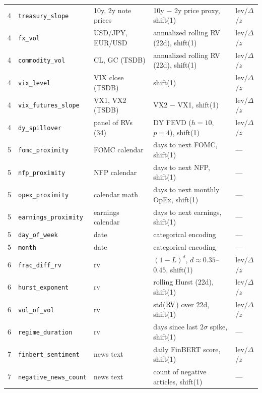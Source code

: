 {\begin{longtable}{@{}cl p{2.4cm} p{4.6cm} l@{}}
4 & \texttt{treasury\_slope} & 10y, 2y note prices & 10y $-$ 2y price proxy, shift(1) & lev/$\Delta$/$z$ \\
4 & \texttt{fx\_vol} & USD/JPY, EUR/USD & annualized rolling RV (22d), shift(1) & lev/$\Delta$/$z$ \\
4 & \texttt{commodity\_vol} & CL, GC (TSDB) & annualized rolling RV (22d), shift(1) & lev/$\Delta$/$z$ \\
4 & \texttt{vix\_level} & VIX close (TSDB) & shift(1) & lev/$\Delta$/$z$ \\
4 & \texttt{vix\_futures\_slope} & VX1, VX2 (TSDB) & VX2 $-$ VX1, shift(1) & lev/$\Delta$/$z$ \\
4 & \texttt{dy\_spillover} & panel of RVs (34) & DY FEVD ($h{=}10$, $p{=}4$), shift(1) & lev/$\Delta$/$z$ \\
\midrule

5 & \texttt{fomc\_proximity} & FOMC calendar & days to next FOMC, shift(1) & --- \\
5 & \texttt{nfp\_proximity} & NFP calendar & days to next NFP, shift(1) & --- \\
5 & \texttt{opex\_proximity} & calendar math & days to next monthly OpEx, shift(1) & --- \\
5 & \texttt{earnings\_proximity} & earnings calendar & days to next earnings, shift(1) & --- \\
5 & \texttt{day\_of\_week} & date & categorical encoding & --- \\
5 & \texttt{month} & date & categorical encoding & --- \\
\midrule

6 & \texttt{frac\_diff\_rv} & rv & $(1-L)^d$, $d \approx 0.35$--$0.45$, shift(1) & lev/$\Delta$/$z$ \\
6 & \texttt{hurst\_exponent} & rv & rolling Hurst (22d), shift(1) & lev/$\Delta$/$z$ \\
6 & \texttt{vol\_of\_vol} & rv & std($\operatorname{RV}$) over 22d, shift(1) & lev/$\Delta$/$z$ \\
6 & \texttt{regime\_duration} & rv & days since last $2\sigma$ spike, shift(1) & --- \\
\midrule

7 & \texttt{finbert\_sentiment} & news text & daily FinBERT score, shift(1) & lev/$\Delta$/$z$ \\
7 & \texttt{negative\_news\_count} & news text & count of negative articles, shift(1) & --- \\

\end{longtable}
}

